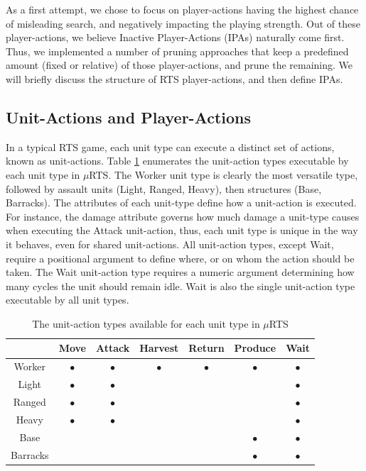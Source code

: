 \documentclass[conference]{IEEEtran}
\newcommand{\mRTS}{$\mu$RTS}
\begin{document}
As a first attempt, we chose to focus on player-actions having the highest chance of misleading search, and negatively impacting the playing strength. Out of these player-actions, we believe Inactive Player-Actions (IPAs) naturally come first. Thus, we implemented a number of pruning approaches that keep a predefined amount (fixed or relative) of those player-actions, and prune the remaining. We will briefly discuss the structure of RTS player-actions, and then define IPAs.


\subsection{Unit-Actions and Player-Actions}

In a typical RTS game, each unit type can execute a distinct set of actions, known as unit-actions. Table \ref{unitActionsTable} enumerates the unit-action types executable by each unit type in \mRTS{}. The Worker unit type is clearly the most versatile type, followed by assault units (Light, Ranged, Heavy), then structures (Base, Barracks). The attributes of each unit-type define how a unit-action is executed. For instance, the damage attribute governs how much damage a unit-type causes when executing the Attack unit-action, thus, each unit type is unique in the way it behaves, even for shared unit-actions. All unit-action types, except Wait, require a positional argument to define where, or on whom the action should be taken. The Wait unit-action type requires a numeric argument determining how many cycles the unit should remain idle. Wait is also the single unit-action type executable by all unit types.

\begin{table}[!h]
\renewcommand{\arraystretch}{1.3}
\caption{The unit-action types available for each unit type in \mRTS{}}
\label{unitActionsTable}
\centering
\begin{tabular}{|c|c|c|c|c|c|c|}
\cline{2-7}
\multicolumn{1}{c|}{} & Move & Attack & Harvest & Return & Produce & Wait \\
\hline
Worker   & $\bullet$ & $\bullet$ & $\bullet$ & $\bullet$ & $\bullet$ & $\bullet$ \\
Light    & $\bullet$ & $\bullet$ & & & & $\bullet$ \\
Ranged   & $\bullet$ & $\bullet$ & & & & $\bullet$ \\
Heavy    & $\bullet$ & $\bullet$ & & & & $\bullet$ \\
Base     & & & & & $\bullet$ & $\bullet$ \\
Barracks & & & & & $\bullet$ & $\bullet$ \\
\hline
\end{tabular}
\end{table}
\end{document}
